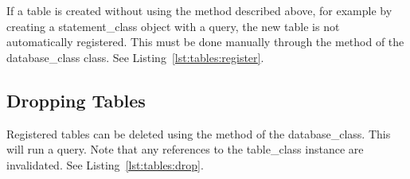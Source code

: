 If a table is created without using the  method described above, for example by creating a \gls{statement_class} object with a  query, the new table is not automatically registered. This must be done manually through the  method of the \gls{database_class} class. See Listing~\ref{lst:tables:register}.



\subsection{Dropping Tables}
\label{section:tables:drop}

Registered tables can be deleted using the  method of the \gls{database_class}. This will run a  query. Note that any references to the \gls{table_class} instance are invalidated. See Listing~\ref{lst:tables:drop}.


